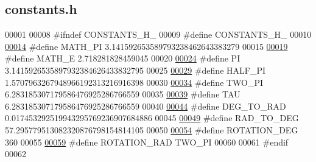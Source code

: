 \hypertarget{constants_8h_source}{}\subsection{constants.\+h}
\label{constants_8h_source}

\begin{DoxyCode}
00001 
00008 \textcolor{preprocessor}{#ifndef CONSTANTS\_H\_}
00009 \textcolor{preprocessor}{#define CONSTANTS\_H\_}
00010 
\hypertarget{constants_8h_source.tex_l00014}{}\hyperlink{constants_8h_ac58cbaeae310f551049f77b7c098599e}{00014} \textcolor{preprocessor}{#define MATH\_PI 3.141592653589793238462643383279}
00015 
\hypertarget{constants_8h_source.tex_l00019}{}\hyperlink{constants_8h_a9ee56816d83d03ce2644259a848f0ecb}{00019} \textcolor{preprocessor}{#define MATH\_E 2.718281828459045}
00020 
\hypertarget{constants_8h_source.tex_l00024}{}\hyperlink{constants_8h_a598a3330b3c21701223ee0ca14316eca}{00024} \textcolor{preprocessor}{#define PI 3.1415926535897932384626433832795}
00025 
\hypertarget{constants_8h_source.tex_l00029}{}\hyperlink{constants_8h_ae3ec3219e4eee3b0992bfd59c2e2bc42}{00029} \textcolor{preprocessor}{#define HALF\_PI 1.5707963267948966192313216916398}
00030 
\hypertarget{constants_8h_source.tex_l00034}{}\hyperlink{constants_8h_a3b947f4b635461030ff2d87833e5049e}{00034} \textcolor{preprocessor}{#define TWO\_PI 6.283185307179586476925286766559}
00035 
\hypertarget{constants_8h_source.tex_l00039}{}\hyperlink{constants_8h_a3d8c9c145887af5174ba4cc6789862ad}{00039} \textcolor{preprocessor}{#define TAU 6.283185307179586476925286766559}
00040 
\hypertarget{constants_8h_source.tex_l00044}{}\hyperlink{constants_8h_a212460e743fecb084d717bb2180c5a56}{00044} \textcolor{preprocessor}{#define DEG\_TO\_RAD 0.017453292519943295769236907684886}
00045 
\hypertarget{constants_8h_source.tex_l00049}{}\hyperlink{constants_8h_a89e47af0449640d4f15191aba5ca24c6}{00049} \textcolor{preprocessor}{#define RAD\_TO\_DEG 57.295779513082320876798154814105}
00050 
\hypertarget{constants_8h_source.tex_l00054}{}\hyperlink{constants_8h_af5a74308a3fd418c13af67f9319e5308}{00054} \textcolor{preprocessor}{#define ROTATION\_DEG 360}
00055 
\hypertarget{constants_8h_source.tex_l00059}{}\hyperlink{constants_8h_a37117cb56189209203e067fd2e196589}{00059} \textcolor{preprocessor}{#define ROTATION\_RAD TWO\_PI}
00060 
00061 \textcolor{preprocessor}{#endif}
00062 
\end{DoxyCode}
